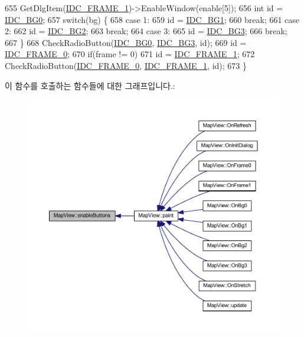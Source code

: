 \begin{DoxyCode}
655   GetDlgItem(\mbox{\hyperlink{resource_8h_aaa3d54ab56340fb1fa8cbf3b218b13ee}{IDC\_FRAME\_1}})->EnableWindow(enable[5]);
656   \textcolor{keywordtype}{int} \textcolor{keywordtype}{id} = \mbox{\hyperlink{resource_8h_ac10192f91d4434cb8a1a3c00c0e143e3}{IDC\_BG0}};
657   \textcolor{keywordflow}{switch}(bg) \{
658   \textcolor{keywordflow}{case} 1:
659     \textcolor{keywordtype}{id} = \mbox{\hyperlink{resource_8h_a238da5af2b82de3c8d0563394f97f6b2}{IDC\_BG1}};
660     \textcolor{keywordflow}{break};
661   \textcolor{keywordflow}{case} 2:
662     \textcolor{keywordtype}{id} = \mbox{\hyperlink{resource_8h_a3ebf831ad9e66fd39c265ee6c645506d}{IDC\_BG2}};
663     \textcolor{keywordflow}{break};
664   \textcolor{keywordflow}{case} 3:
665     \textcolor{keywordtype}{id} = \mbox{\hyperlink{resource_8h_a7bde682dd1cfa236c27f69d59f2382f7}{IDC\_BG3}};
666     \textcolor{keywordflow}{break};
667   \}
668   CheckRadioButton(\mbox{\hyperlink{resource_8h_ac10192f91d4434cb8a1a3c00c0e143e3}{IDC\_BG0}}, \mbox{\hyperlink{resource_8h_a7bde682dd1cfa236c27f69d59f2382f7}{IDC\_BG3}}, \textcolor{keywordtype}{id});
669   \textcolor{keywordtype}{id} = \mbox{\hyperlink{resource_8h_ab4bccbcf89d4ccb95d624cf128bfb2db}{IDC\_FRAME\_0}};
670   \textcolor{keywordflow}{if}(frame != 0)
671     \textcolor{keywordtype}{id} = \mbox{\hyperlink{resource_8h_aaa3d54ab56340fb1fa8cbf3b218b13ee}{IDC\_FRAME\_1}};
672   CheckRadioButton(\mbox{\hyperlink{resource_8h_ab4bccbcf89d4ccb95d624cf128bfb2db}{IDC\_FRAME\_0}}, \mbox{\hyperlink{resource_8h_aaa3d54ab56340fb1fa8cbf3b218b13ee}{IDC\_FRAME\_1}}, \textcolor{keywordtype}{id});
673 \}
\end{DoxyCode}
이 함수를 호출하는 함수들에 대한 그래프입니다.\+:
\nopagebreak
\begin{figure}[H]
\begin{center}
\leavevmode
\includegraphics[width=350pt]{class_map_view_aad00c64b13ff280b4279a7f8cd57b083_icgraph}
\end{center}
\end{figure}
\mbox{\label{class_map_view_ad05aa1227f5a62d8e9477eeeec37115c}} 
